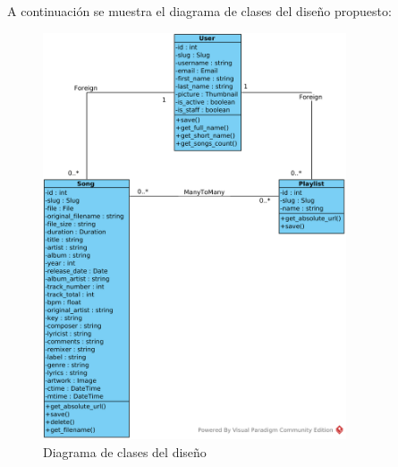 A continuación se muestra el diagrama de clases del diseño propuesto:

\begin{figure}[H]
  \begin{center}
  \includegraphics[width=0.8\textwidth]{../visual_paradigm_uml/Diagrama_clases.png}
  \caption{Diagrama de clases del diseño}
  \label{fig:diag_class}
  \end{center}
\end{figure}

